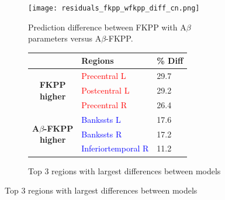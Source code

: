 \begin{figure}[h]
    \centering
    \begin{subfigure}[b]{\linewidth}
        \centering
        \texttt{[image: residuals\_fkpp\_wfkpp\_diff\_cn.png]}
        \caption{Prediction difference between FKPP with A$\beta$ parameters versus A$\beta$-FKPP.}
        \label{fig:fkpp_wfkpp_diff}
    \end{subfigure}
    
    \vspace{1em} %
    
    \begin{subfigure}[b]{\linewidth}
        \centering
        \begin{tabular}{c|p{2.7cm}|p{1.5cm}}
            \toprule
                & \textbf{Regions} & \textbf{\% Diff} \\
            \midrule
            \multirow{3}{*}{%
                \parbox{2.3cm}{\centering \textbf{FKPP}\\ \textbf{higher}}
            }
                & \textcolor{red}{Precentral L} & 29.7\\
                & \textcolor{red}{Postcentral L} & 29.2\\
                & \textcolor{red}{Precentral R} & 26.4\\ 
            \midrule
            \multirow{3}{*}{%
                \parbox{2.3cm}{\centering \textbf{A$\beta$-FKPP}\\ \textbf{higher}}
            }
                & \textcolor{blue}{Bankssts L} &17.6\\
                & \textcolor{blue}{Bankssts R} &17.2\\
                & \textcolor{blue}{Inferiortemporal R} &11.2\\
            \bottomrule
        \end{tabular}
        \caption{Top 3 regions with largest differences between models}
        \label{tab:fkpp_wfkpp_diff}
    \end{subfigure}
    
\end{figure}

    
    

